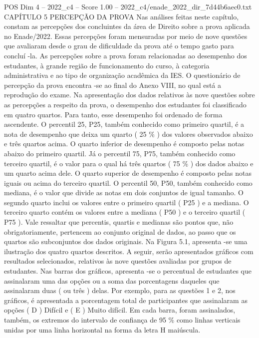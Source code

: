 \begin{textsample}{POS Dim 4 – 2022\_c4 – Score 1.00 – 2022\_c4/enade\_2022\_dir\_7d44b6aec0.txt}  \label{ex:f4_pos_147}
CAPÍTULO 5 PERCEPÇÃO DA PROVA Nas análises feitas neste capítulo, constam as percepções dos concluintes da área de Direito sobre a prova aplicada no Enade/2022.
Essas percepções foram mensuradas por meio de nove questões que avaliaram desde o grau de dificuldade da prova até o tempo gasto para concluí -la.
As percepções sobre a prova foram relacionadas ao desempenho dos estudantes, à grande região de funcionamento do curso, à categoria administrativa e ao tipo de organização acadêmica da IES.
O questionário de percepção da prova encontra -se ao final do Anexo VIII, no qual está a reprodução do exame.
Na apresentação dos dados relativos às nove questões sobre as percepções a respeito da prova, o desempenho dos estudantes foi classificado em quatro quartos.
Para tanto, esse desempenho foi ordenado de forma ascendente.
O percentil 25, P25, também conhecido como primeiro quartil, é a nota de desempenho que deixa um quarto ( 25 \% ) dos valores observados abaixo e três quartos acima.
O quarto inferior de desempenho é composto pelas notas abaixo do primeiro quartil.
Já o percentil 75, P75, também conhecido como terceiro quartil, é o valor para o qual há três quartos ( 75 \% ) dos dados abaixo e um quarto acima dele.
O quarto superior de desempenho é composto pelas notas iguais ou acima do terceiro quartil.
O percentil 50, P50, também conhecido como mediana, é o valor que divide as notas em dois conjuntos de igual tamanho.
O segundo quarto inclui os valores entre o primeiro quartil ( P25 ) e a mediana.
O terceiro quarto contém os valores entre a mediana ( P50 ) e o terceiro quartil ( P75 ).
Vale ressaltar que percentis, quartis e medianas são pontos que, não obrigatoriamente, pertencem ao conjunto original de dados, ao passo que os quartos são subconjuntos dos dados originais.
Na Figura 5.1, apresenta -se uma ilustração dos quatro quartos descritos.
A seguir, serão apresentados gráficos com resultados selecionados, relativos às nove questões avaliadas por grupos de estudantes.
Nas barras dos gráficos, apresenta -se o percentual de estudantes que assinalaram uma das opções ou a soma das porcentagens daqueles que assinalaram duas ( ou três ) delas.
Por exemplo, para as questões 1 e 2, nos gráficos, é apresentada a porcentagem total de participantes que assinalaram as opções ( D ) Difícil e ( E ) Muito difícil.
Em cada barra, foram assinalados, também, os extremos do intervalo de confiança de 95 \% como linhas verticais unidas por uma linha horizontal na forma da letra H maiúscula.

\end{textsample}
